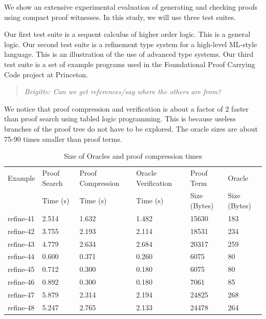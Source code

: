 \documentclass{acmconf}
\newenvironment{note}{\begin{quote}\message{note!}\it}{\end{quote}}
\begin{document}
We show an extensive experimental evaluation of generating and
checking proofs using compact proof witnesses. In this study, we will
use three test suites.

Our first test suite is a sequent calculus of higher order logic. This 
is a general logic. Our second test suite is a refinement type system for 
a high-level ML-style language. This is an illustration of the use of 
advanced type systems. Our third test suite is a set of example programs
used in the Foundational Proof Carrying Code project at Princeton.
\begin{note}
  Brigitte: Can we get references/say where the others are from?
\end{note}

We notice that proof compression and verification is about a factor of 2
faster than proof search using tabled logic programming. This is because 
useless branches of the proof tree do not have to be explored. The oracle
sizes are about 75-90 times smaller than proof terms.

\begin{table}[tbp]
\begin{center}
\begin{small}
\begin{tabular}{|l|l|l|l|l|l|}
\hline
Example & Proof Search & Proof Compression 
& Oracle Verification & Proof Term & Oracle \\
& Time (s) & Time (s) & Time (s) & Size (Bytes) & Size (Bytes)\\
\hline
refine-41 & 2.514 & 1.632 & 1.482 & 15630 & 183\\
refine-42 & 3.755 & 2.193 & 2.114 & 18531 & 234\\
refine-43 & 4.779 & 2.634 & 2.684 & 20317 & 259\\
refine-44 & 0.600 & 0.371 & 0.260 & 6075 & 80\\
refine-45 & 0.712 & 0.300 & 0.180 & 6075 & 80\\
refine-46 & 0.892 & 0.300 & 0.180 & 7061 & 85\\
refine-47 & 5.879 & 2.314 & 2.194 & 24825 & 268\\
refine-48 & 5.247 & 2.765 & 2.133 & 24478 & 264\\
\hline
\end{tabular}
\end{small}
\end{center}
\caption{\label{tab:proofsize} Size of Oracles and proof compression times}
\end{table}
\end{document}
